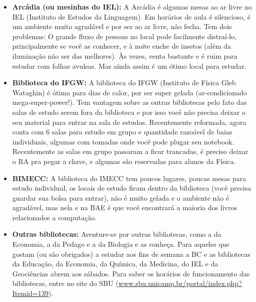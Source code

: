 \begin{itemize}
    \item  \textbf{Arcádia (ou mesinhas do IEL):} A Arcádia é algumas mesas ao
        ar livre no IEL (Instituto de Estudos da Linguagem). Em horários de aula
        é silencioso, é um ambiente muito agradável e por ser ao ar livre, não
        fecha.  Tem dois problemas: O grande fluxo de pessoas no local pode
        facilmente distraí-lo, principalmente se você as conhecer, e à noite
        enche de insetos (além da iluminação não ser das melhores). Às vezes,
        venta bastante e é ruim para estudar com folhas avulsas. Mas ainda assim
        é um ótimo local para estudar.

    \item  \textbf{Biblioteca do IFGW:} A biblioteca do IFGW (Instituto de
        Física Gleb Wataghin) é ótima para dias de calor, por ser super gelada
        (ar-condicionado mega-super-power!). Tem vantagem sobre as outras
        bibliotecas pelo fato das salas de estudo serem fora da biblioteca e por
        isso você não precisa deixar o seu material para entrar na sala de
        estudos. Recentemente reformada, agora conta com 6 salas para estudo em
        grupo e quantidade razoável de baias individuais, algumas com tomadas
        onde você pode plugar seu notebook. Recentemente as salas em grupo
        passaram a ficar trancadas, é preciso deixar o RA pra pegar a chave, e
        algumas são reservadas para alunos da Física.

    \item  \textbf{BIMECC:} A biblioteca do IMECC tem poucos lugares, poucas
        mesas para estudo individual, os locais de estudo ficam dentro da
        biblioteca (você precisa guardar sua bolsa para entrar), não é muito
        gelada e o ambiente não é agradável, mas nela e na BAE é que você
        encontrará a maioria dos livros relacionados a computação.

    \item  \textbf{Outras bibliotecas:} Aventure-se por outras bibliotecas, como
        a da Economia, a da Pedago e a da Biologia e as conheça. Para aqueles
        que gostam (ou são obrigados) a estudar aos fins de semana a BC e as
        bibliotecas da Educação, da Economia, da Química, da Medicina, do IEL e
        da Geociências abrem aos sábados. Para saber os horários de
        funcionamento das bibliotecas, entre no site do SBU
        (\url{www.sbu.unicamp.br/portal/index.php?Itemid=139}).


\end{itemize}
